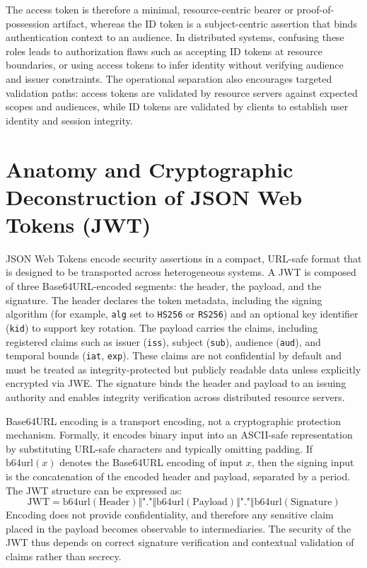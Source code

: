 \documentclass[11pt,a4paper]{report}
\begin{document}
The access token is therefore a minimal, resource-centric bearer or proof-of-possession artifact, whereas the ID token is a subject-centric assertion that binds authentication context to an audience. In distributed systems, confusing these roles leads to authorization flaws such as accepting ID tokens at resource boundaries, or using access tokens to infer identity without verifying audience and issuer constraints. The operational separation also encourages targeted validation paths: access tokens are validated by resource servers against expected scopes and audiences, while ID tokens are validated by clients to establish user identity and session integrity.

\section{Anatomy and Cryptographic Deconstruction of JSON Web Tokens (JWT)}
\label{sec:jwt-anatomy}
JSON Web Tokens encode security assertions in a compact, URL-safe format that is designed to be transported across heterogeneous systems. A JWT is composed of three Base64URL-encoded segments: the header, the payload, and the signature. The header declares the token metadata, including the signing algorithm (for example, \texttt{alg} set to \texttt{HS256} or \texttt{RS256}) and an optional key identifier (\texttt{kid}) to support key rotation. The payload carries the claims, including registered claims such as issuer (\texttt{iss}), subject (\texttt{sub}), audience (\texttt{aud}), and temporal bounds (\texttt{iat}, \texttt{exp}). These claims are not confidential by default and must be treated as integrity-protected but publicly readable data unless explicitly encrypted via JWE. The signature binds the header and payload to an issuing authority and enables integrity verification across distributed resource servers.

Base64URL encoding is a transport encoding, not a cryptographic protection mechanism. Formally, it encodes binary input into an ASCII-safe representation by substituting URL-safe characters and typically omitting padding. If $\mathrm{b64url}(x)$ denotes the Base64URL encoding of input $x$, then the signing input is the concatenation of the encoded header and payload, separated by a period. The JWT structure can be expressed as:
\begin{equation}
\label{eq:jwt-structure}
\mathrm{JWT} = \mathrm{b64url}(\mathrm{Header}) \Vert \texttt{"."} \Vert \mathrm{b64url}(\mathrm{Payload}) \Vert \texttt{"."} \Vert \mathrm{b64url}(\mathrm{Signature})
\end{equation}
Encoding does not provide confidentiality, and therefore any sensitive claim placed in the payload becomes observable to intermediaries. The security of the JWT thus depends on correct signature verification and contextual validation of claims rather than secrecy.
\end{document}

